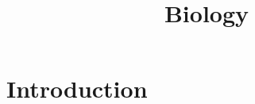 \documentclass[10pt]{extarticle}
\title{Biology}
\begin{document}
\maketitle
\noindent
\section{Introduction} 
\end{document}
